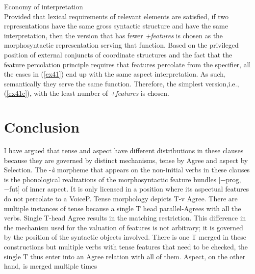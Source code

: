 \documentclass[output=paper,colorlinks,citecolor=brown]{langscibook}
\begin{document}
\ea
Economy of interpretation\\
Provided that lexical requirements of relevant elements are satisfied, if two representations have the same gross syntactic structure and have the same interpretation, then the version that has fewer \emph{+features} is chosen as the morphosyntactic representation serving that function.
\ex \label{ex41}
\z
\z
Based on the privileged position of external conjuncts of coordinate structures and the fact that the feature percolation principle requires that features percolate from the specifier, all the cases in (\ref{ex41}) end up with the same aspect interpretation. As such, semantically they serve the same function. Therefore, the simplest version,i.e., (\ref{ex41c}), with the least number of \emph{+features} is chosen. 


\section{Conclusion}\label{sec:owusu:5}
I have argued that tense and aspect have different distributions in these clauses because they are governed by distinct mechanisms, tense by Agree and aspect by Selection. The -\emph{à} morpheme that appears on the non-initial verbs in these clauses is the phonological realizations of the morphosyntactic feature bundles [−prog,−fut] of inner aspect. It is only licensed in a position where its aspectual features do not percolate to a VoiceP. Tense morphology depicts T-v Agree. There are multiple instances of tense because a single T head parallel-Agrees with all the verbs. Single T-head Agree results in the matching restriction. This difference in the mechanism used for the valuation of features is not arbitrary; it is governed by the position of the syntactic objects involved. There is one T merged in these constructions but multiple verbs with tense features that need to be checked, the single T thus enter into an Agree relation with all of them.  Aspect, on the other hand,  is merged multiple times 



\end{document}
